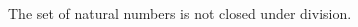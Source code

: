 %
%
%
%
%



\begin{list}{\bf{\ref{exer:sec11-8}.}}
\item \begin{list}{\bf{(a)}}
\item The set of natural numbers is not closed under division.
\end{list}
\end{list}

